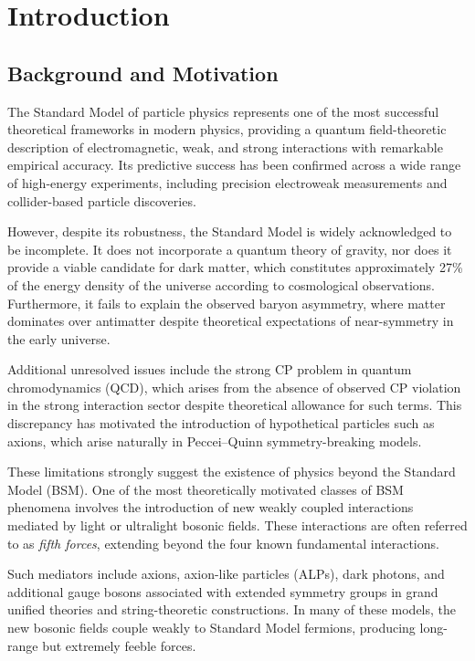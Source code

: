 \documentclass[12pt,a4paper]{report}
\begin{document}
\chapter{Introduction}

\section{Background and Motivation}

The Standard Model of particle physics represents one of the most successful
theoretical frameworks in modern physics, providing a quantum field-theoretic
description of electromagnetic, weak, and strong interactions with remarkable
empirical accuracy. Its predictive success has been confirmed across a wide
range of high-energy experiments, including precision electroweak measurements
and collider-based particle discoveries.

However, despite its robustness, the Standard Model is widely acknowledged to
be incomplete. It does not incorporate a quantum theory of gravity, nor does it
provide a viable candidate for dark matter, which constitutes approximately 27\%
of the energy density of the universe according to cosmological observations.
Furthermore, it fails to explain the observed baryon asymmetry, where matter
dominates over antimatter despite theoretical expectations of near-symmetry in
the early universe.

Additional unresolved issues include the strong CP problem in quantum
chromodynamics (QCD), which arises from the absence of observed CP violation
in the strong interaction sector despite theoretical allowance for such terms.
This discrepancy has motivated the introduction of hypothetical particles such
as axions, which arise naturally in Peccei--Quinn symmetry-breaking models.

These limitations strongly suggest the existence of physics beyond the Standard
Model (BSM). One of the most theoretically motivated classes of BSM phenomena
involves the introduction of new weakly coupled interactions mediated by light
or ultralight bosonic fields. These interactions are often referred to as
\emph{fifth forces}, extending beyond the four known fundamental interactions.

Such mediators include axions, axion-like particles (ALPs), dark photons, and
additional gauge bosons associated with extended symmetry groups in grand
unified theories and string-theoretic constructions. In many of these models,
the new bosonic fields couple weakly to Standard Model fermions, producing
long-range but extremely feeble forces.
\end{document}
